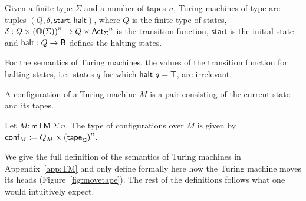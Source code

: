 \begin{definition}
  Given a finite type $\Sigma$ and a number of tapes $n$, Turing machines of type  are tuples $(Q, \delta, \textsf{start}, \textsf{halt})$, where $Q$ is the finite type of states, $\delta : Q \times {(\mathbb{O}{(\Sigma)})}^n \rightarrow Q \times {\textsf{Act}_\Sigma}^n$ is the transition function, $\textsf{start}$ is the initial state and $\textsf{halt} : Q \rightarrow \textsf{B}$ defines the halting states.
\end{definition}
For the semantics of Turing machines, the values of the transition function for halting states, i.e.\ states $q$ for which $\textsf{halt}~q = \mathsf{T}$, are irrelevant. 

A configuration of a Turing machine $M$ is a pair consisting of the current state and its tapes.
\begin{definition}[Configurations]
  Let $M : \textsf{mTM}~\Sigma~n$. The type of configurations over $M$ is given by 
  $\textsf{conf}_{M} \coloneqq Q_{M} \times {(\textsf{tape}_{\Sigma})}^n$.
\end{definition}

We give the full definition of the semantics of Turing machines in Appendix~\ref{app:TM} and only define formally here how the Turing machine moves its heads (Figure~\ref{fig:movetape}). The rest of the definitions follows what one would intuitively expect.

